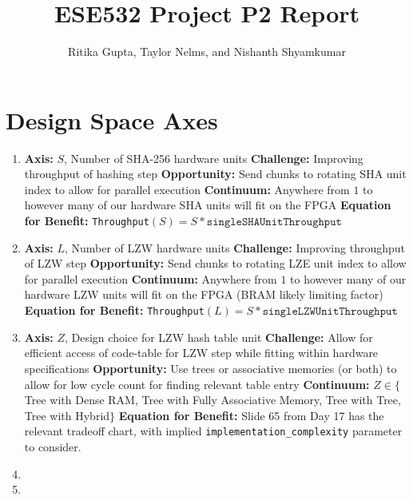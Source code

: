 \documentclass{article}
\title{ESE532 Project P2 Report}
\author{Ritika Gupta, Taylor Nelms, and Nishanth Shyamkumar}
\begin{document}
\maketitle


\section{Design Space Axes}
\begin{enumerate}
\item%

\textbf{Axis:} $S$, Number of SHA-256 hardware units
\newline
\textbf{Challenge:} Improving throughput of hashing step
\newline
\textbf{Opportunity:} Send chunks to rotating SHA unit index to allow for parallel execution
\newline
\textbf{Continuum:} Anywhere from $1$ to however many of our hardware SHA units will fit on the FPGA
\newline
\textbf{Equation for Benefit:} \texttt{Throughput}$\left(S\right)=S*\texttt{singleSHAUnitThroughput}$

\item%

\textbf{Axis:} $L$, Number of LZW hardware units
\newline
\textbf{Challenge:} Improving throughput of LZW step
\newline
\textbf{Opportunity:} Send chunks to rotating LZE unit index to allow for parallel execution
\newline
\textbf{Continuum:} Anywhere from $1$ to however many of our hardware LZW units will fit on the FPGA (BRAM likely limiting factor)
\newline
\textbf{Equation for Benefit:} \texttt{Throughput}$\left(L\right)=S*\texttt{singleLZWUnitThroughput}$

\item%

\textbf{Axis:} $Z$, Design choice for LZW hash table unit
\newline
\textbf{Challenge:} Allow for efficient access of code-table for LZW step while fitting within hardware specifications
\newline
\textbf{Opportunity:} Use trees or associative memories (or both) to allow for low cycle count for finding relevant table entry
\newline
\textbf{Continuum:} $Z\in\{$Tree with Dense RAM, Tree with Fully Associative Memory, Tree with Tree, Tree with Hybrid$\}$
\newline
\textbf{Equation for Benefit:} Slide 65 from Day 17 has the relevant tradeoff chart, with implied \texttt{implementation\_complexity} parameter to consider.

\item%


\item%


\end{enumerate}
\end{document}
